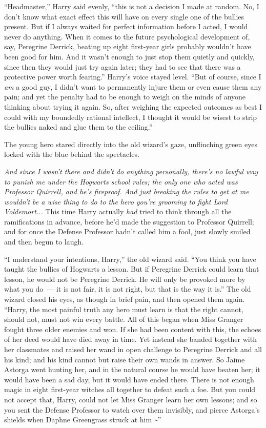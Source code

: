 ``Headmaster,'' Harry said evenly, ``this is not a decision I made at random. No, I don't know what exact effect this will have on every single one of the bullies present. But if I always waited for perfect information before I acted, I would never do anything. When it comes to the future psychological development of, say, Peregrine Derrick, beating up eight first-year girls probably wouldn't have been good for him. And it wasn't enough to just stop them quietly and quickly, since then they would just try again later; they had to see that there was a protective power worth fearing.'' Harry's voice stayed level. ``But of course, since I \emph{am} a good guy, I didn't want to permanently injure them or even cause them any pain; and yet the penalty had to be enough to weigh on the minds of anyone thinking about trying it again. So, after weighing the expected outcomes as best I could with my boundedly rational intellect, I thought it would be wisest to strip the bullies naked and glue them to the ceiling.''

The young hero stared directly into the old wizard's gaze, unflinching green eyes locked with the blue behind the spectacles.

\emph{And since I wasn't there and didn't do anything personally, there's no lawful way to punish me under the Hogwarts school rules; the only one who acted was Professor Quirrell, and he's fireproof. And just breaking the rules to get at me wouldn't be a wise thing to do to the hero you're grooming to fight Lord Voldemort...} This time Harry actually \emph{had} tried to think through all the ramifications in advance, before he'd made the suggestion to Professor Quirrell; and for once the Defense Professor hadn't called him a fool, just slowly smiled and then begun to laugh.

``I understand your intentions, Harry,'' the old wizard said. ``You think you have taught the bullies of Hogwarts a lesson. But if Peregrine Derrick could learn that lesson, he would not be Peregrine Derrick. He will only be provoked more by what you do~--- it is not fair, it is not right, but that is the way it is.'' The old wizard closed his eyes, as though in brief pain, and then opened them again. ``Harry, the most painful truth any hero must learn is that the right cannot, should not, must not win every battle. All of this began when Miss Granger fought three older enemies and won. If she had been content with this, the echoes of her deed would have died away in time. Yet instead she banded together with her classmates and raised her wand in open challenge to Peregrine Derrick and all his kind; and his kind cannot but raise their own wands in answer. So Jaime Astorga went hunting her, and in the natural course he would have beaten her; it would have been a sad day, but it would have ended there. There is not enough magic in eight first-year witches all together to defeat such a foe. But you could not accept that, Harry, could not let Miss Granger learn her own lessons; and so you sent the Defense Professor to watch over them invisibly, and pierce Astorga's shields when Daphne Greengrass struck at him~-''

